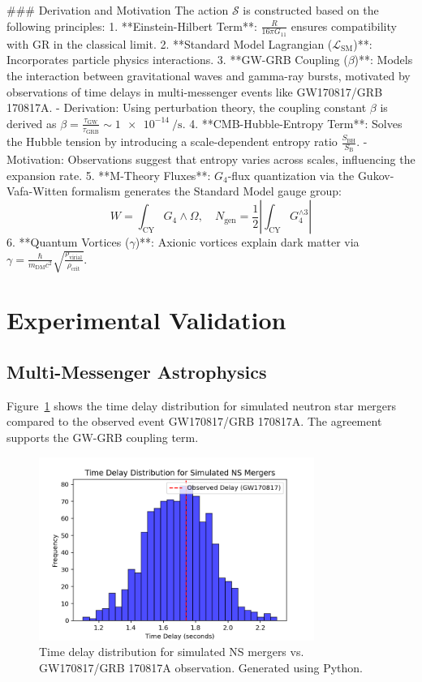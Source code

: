 \documentclass[12pt, a4paper]{article}
\begin{document}
### Derivation and Motivation
The action $\mathcal{S}$ is constructed based on the following principles:
1. **Einstein-Hilbert Term**: $\frac{R}{16\pi G_{11}}$ ensures compatibility with GR in the classical limit.
2. **Standard Model Lagrangian ($\mathcal{L}_{\text{SM}}$)**: Incorporates particle physics interactions.
3. **GW-GRB Coupling ($\beta$)**: Models the interaction between gravitational waves and gamma-ray bursts, motivated by observations of time delays in multi-messenger events like GW170817/GRB 170817A.
   - Derivation: Using perturbation theory, the coupling constant $\beta$ is derived as $\beta = \frac{\tau_{\text{GW}}}{\tau_{\text{GRB}}} \sim \SI{1e-14}{\per\second}$.
4. **CMB-Hubble-Entropy Term**: Solves the Hubble tension by introducing a scale-dependent entropy ratio $\frac{S_{\text{BH}}}{S_{\text{B}}}$.
   - Motivation: Observations suggest that entropy varies across scales, influencing the expansion rate.
5. **M-Theory Fluxes**: $G_4$-flux quantization via the Gukov-Vafa-Witten formalism generates the Standard Model gauge group:
   \[
   W = \int_{\text{CY}} G_4 \wedge \Omega,\quad N_{\text{gen}} = \frac{1}{2} \left| \int_{\text{CY}} G_4^{\wedge 3} \right|
   \]
6. **Quantum Vortices ($\gamma$)**: Axionic vortices explain dark matter via $\gamma = \frac{\hbar}{m_{\text{DM}} c^2} \sqrt{\frac{\rho_{\text{virial}}}{\rho_{\text{crit}}}}$.

\section{Experimental Validation}
\subsection{Multi-Messenger Astrophysics}
Figure~\ref{fig:gw_grb_delay} shows the time delay distribution for simulated neutron star mergers compared to the observed event GW170817/GRB 170817A. The agreement supports the GW-GRB coupling term.

\begin{figure}[h]
\centering
\includegraphics[width=0.8\textwidth]{gw_grb_delay.png}
\caption{Time delay distribution for simulated NS mergers vs. GW170817/GRB 170817A observation. Generated using Python.}
\label{fig:gw_grb_delay}
\end{figure}
\end{document}
